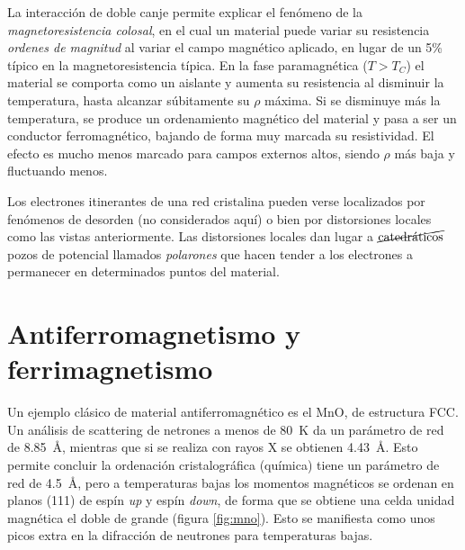 \documentclass{tufte-book}
\newcommand{\sub}[1]{_{{\scriptscriptstyle\mathit{#1}}}}
\begin{document}
La interacción de doble canje permite explicar el fenómeno de la
\emph{magnetoresistencia colosal}, en el cual un material puede variar
su resistencia \emph{ordenes de magnitud} al variar el campo magnético
aplicado, en lugar de un 5\% típico en la magnetoresistencia típica.
En la fase paramagnética ($T>T\sub{C}$) el material se comporta como
un aislante y aumenta su resistencia al disminuir la temperatura,
hasta alcanzar súbitamente su $ρ$ máxima. Si se disminuye más la
temperatura, se produce un ordenamiento magnético del material y pasa
a ser un conductor ferromagnético, bajando de forma muy marcada su
resistividad. El efecto es mucho menos marcado para campos externos
altos, siendo $ρ$ más baja y fluctuando menos.

Los electrones itinerantes de una red cristalina pueden verse
localizados por fenómenos de desorden (no considerados aquí) o bien
por distorsiones locales como las vistas anteriormente. Las
distorsiones locales dan lugar a $\cancel{\text{catedráticos}}$ pozos
de potencial llamados \emph{polarones} que hacen tender a los
electrones a permanecer en determinados puntos del material.

\section{Antiferromagnetismo y ferrimagnetismo}
Un ejemplo clásico de material antiferromagnético es el MnO, de
estructura FCC. Un análisis de scattering de netrones a menos de
\SI{80}{\kelvin} da un parámetro de red de \SI{8.85}{\angstrom},
mientras que si se realiza con rayos X se obtienen
\SI{4.43}{\angstrom}. Esto permite concluir la ordenación
cristalográfica (química) tiene un parámetro de red de
\SI{4.5}{\angstrom}, pero a temperaturas bajas los momentos magnéticos
se ordenan en planos (111) de espín \textit{up} y espín \textit{down},
de forma que se obtiene una celda unidad magnética el doble de grande
(figura \ref{fig:mno}). Esto se manifiesta como unos picos extra en la
difracción de neutrones para temperaturas bajas.
\end{document}

